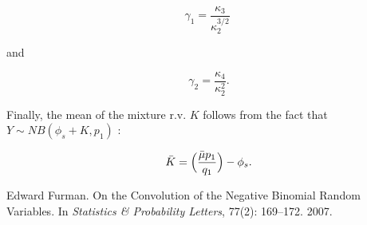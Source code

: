 \documentclass{article}
\begin{document}
\begin{equation}
	\gamma_1 = \frac{ \kappa_3 }{ \kappa_2^{ 3/2 } }
\end{equation}

and 

\begin{equation}
	\phantom{ . } \gamma_2 = \frac{ \kappa_4 }{ \kappa_2^{ 2 } } .
\end{equation}

Finally, the mean of the mixture r.v. $K$ follows from the fact that $Y \sim NB( \phi_s + K, p_1 )$ \cite{furmanConvolutionNegativeBinomial2007}:

\begin{equation}
	\phantom{ . } \bar{ K } = \Bigl( \frac{ \bar{ \mu } p_1 } { q_1 } \Bigr) - \phi_s .
\end{equation}

\begin{thebibliography}{1}

Edward Furman.
\newblock On the Convolution of the Negative Binomial Random Variables.
\newblock In {\em Statistics \& Probability Letters}, 77(2): 169--172. 2007.

 \end{thebibliography}
\end{document}
